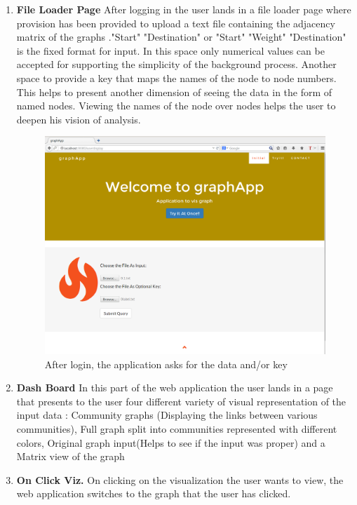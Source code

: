 \begin{enumerate}
\item \textbf{File Loader Page} After logging in the user lands in a file loader page where provision has been provided to upload a text file containing the adjacency matrix of the graphs ."Start" "Destination" or "Start" "Weight" "Destination" is the fixed format for input. In this space only numerical values can be accepted for supporting the simplicity of the background process. Another space to provide a key that maps the names of the node to node numbers. This helps to present another dimension of seeing the data in the form of named nodes.  Viewing the names of the node over nodes helps the user to deepen his vision of analysis. 
\begin{figure}[H]
\centering
\includegraphics[scale=0.3]{s3.png}
\caption{After login, the application asks for the data and/or key }
\end{figure}


\item \textbf{Dash Board} In this part of the web application the user lands in a page that presents to the user four different variety of visual representation of the input data :  Community graphs (Displaying the links between various communities), Full graph split into communities represented with different colors, Original graph input(Helps to see if the input was proper) and a Matrix view of the graph

\item \textbf{On Click Viz.} On clicking on the visualization the user wants to view, the web application switches to the graph that the user has clicked.


\end{enumerate}
